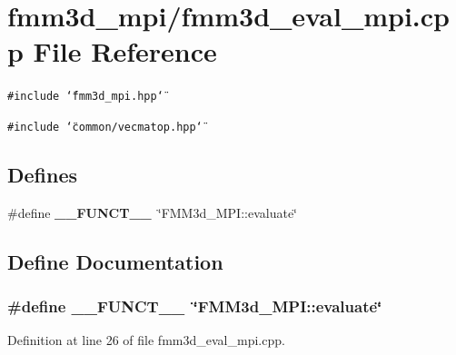 \section{fmm3d\_\-mpi/fmm3d\_\-eval\_\-mpi.cpp File Reference}
\label{fmm3d__eval__mpi_8cpp}


{\tt \#include \char`\"{}fmm3d\_\-mpi.hpp\char`\"{}}\par
{\tt \#include \char`\"{}common/vecmatop.hpp\char`\"{}}\par
\subsection*{Defines}
\begin{CompactItemize}
\item 
\#define {\bf \_\-\_\-FUNCT\_\-\_\-}~\char`\"{}FMM3d\_\-MPI::evaluate\char`\"{}
\end{CompactItemize}


\subsection{Define Documentation}
\subsubsection{\setlength{\rightskip}{0pt plus 5cm}\#define \_\-\_\-FUNCT\_\-\_\-~\char`\"{}FMM3d\_\-MPI::evaluate\char`\"{}}\label{fmm3d__eval__mpi_8cpp_2818853adf63a17949cf67d73c1d4473_2818853adf63a17949cf67d73c1d4473}




Definition at line 26 of file fmm3d\_\-eval\_\-mpi.cpp.